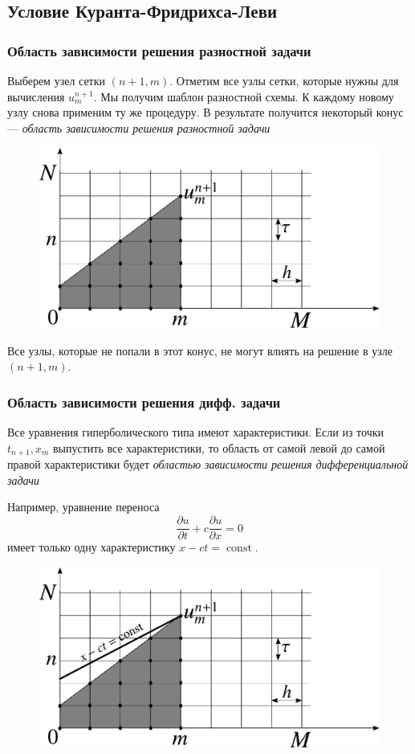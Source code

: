 \documentclass[professionalfonts,compress,unicode,aspectratio=169]{beamer}
\begin{document}
\subsection{Условие Куранта-Фридрихса-Леви}
\begin{frame}\frametitle{Область зависимости решения разностной задачи}
	Выберем узел сетки $(n+1,m)$. Отметим все узлы сетки, которые нужны для вычисления $u^{n+1}_{m}$. 
	Мы получим шаблон разностной схемы. К каждому новому узлу снова применим ту же процедуру.
	В результате получится некоторый конус --- \emph{область зависимости решения разностной задачи}
	\begin{figure}%
	\includegraphics[height=.5\textheight]{grid_dep.pdf}%
	\end{figure}
	Все узлы, которые не попали в этот конус, не могут влиять на решение в узле
$(n+1,m)$.
\end{frame}

\begin{frame}\frametitle{Область зависимости решения дифф. задачи}
	Все уравнения гиперболического типа имеют характеристики. 
	Если из точки $t_{n+1}, x_m$ выпустить все характеристики, то область от самой левой
	до самой правой характеристики будет \emph{областью зависимости решения дифференциальной задачи}

	Например, уравнение переноса 
	\[
	\frac{\partial u}{\partial t} + c \frac{\partial u}{\partial x} = 0
	\]
	имеет только одну характеристику $x - ct = \operatorname{const}$.
	\begin{figure}%
	\includegraphics[height=.45\textheight]{grid_dep2.pdf}%
	\end{figure}
\end{frame}
\end{document}
